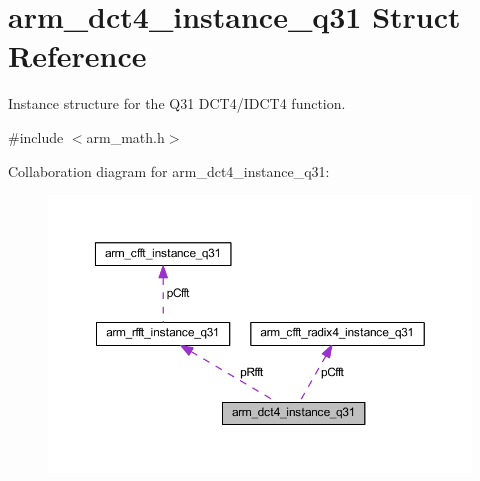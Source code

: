 \hypertarget{structarm__dct4__instance__q31}{}\section{arm\+\_\+dct4\+\_\+instance\+\_\+q31 Struct Reference}
\label{structarm__dct4__instance__q31}


Instance structure for the Q31 D\+C\+T4/\+I\+D\+C\+T4 function.  




{\ttfamily \#include $<$arm\+\_\+math.\+h$>$}



Collaboration diagram for arm\+\_\+dct4\+\_\+instance\+\_\+q31\+:
\nopagebreak
\begin{figure}[H]
\begin{center}
\leavevmode
\includegraphics[width=350pt]{structarm__dct4__instance__q31__coll__graph}
\end{center}
\end{figure}
